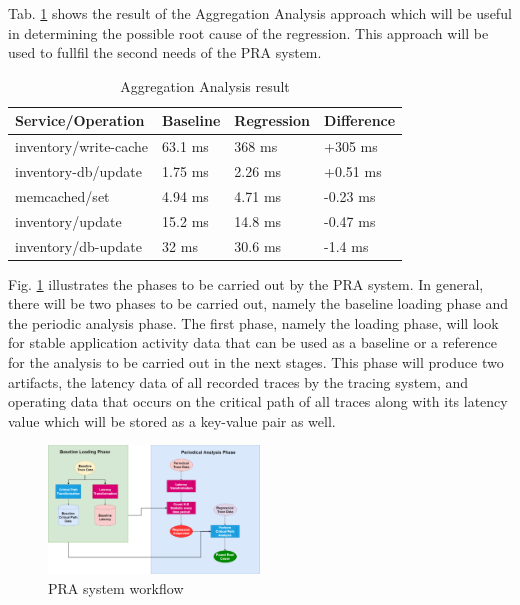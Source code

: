 \documentclass[conference]{configs/IEEEtran}
\begin{document}
Tab. \ref{aggregate} shows the result of the Aggregation Analysis approach which will be useful in determining the possible root cause of the regression. This approach will be used to fullfil the second needs of the PRA system.
\begin{table}[!htb]
	\caption{Aggregation Analysis result}
	\label{aggregate}
	\centering
	\begin{tabular}{|l|l|l|l|}
		\hline
		\textbf{Service/Operation} & \textbf{Baseline} & \textbf{Regression} & \textbf{Difference} \\ \hline
		inventory/write-cache & 63.1 ms & 368 ms  & +305 ms  \\ \hline
		inventory-db/update   & 1.75 ms & 2.26 ms & +0.51 ms \\ \hline
		memcached/set         & 4.94 ms & 4.71 ms & -0.23 ms \\ \hline
		inventory/update      & 15.2 ms & 14.8 ms & -0.47 ms \\ \hline
		inventory/db-update   & 32 ms   & 30.6 ms & -1.4 ms  \\ \hline
	\end{tabular}
\end{table}

Fig. \ref{flow-pra} illustrates the phases to be carried out by the PRA system. In general, there will be two phases to be carried out, namely the baseline loading phase
and the periodic analysis phase. The first phase, namely the loading phase, will look for stable application activity data that can be used as a baseline or a reference for the analysis to be carried out in the next stages. This phase
will produce two artifacts, the latency data of all recorded traces by the tracing system, and operating data that occurs on the critical path of all traces along with its latency value which will be stored as a key-value pair as well.
\begin{figure}[!htb]
	\centering
	\includegraphics[width=0.5\textwidth,scale=5]{resources/ch3/alur_v2.png}
	\caption{PRA system workflow}
	\label{flow-pra}
\end{figure}
\end{document}
